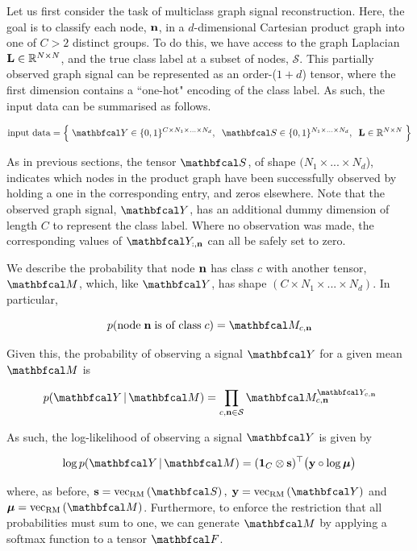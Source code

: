Let us first consider the task of multiclass graph signal reconstruction. Here, the goal is to classify each node, $\mathbf{n}$, in a $d$-dimensional Cartesian product graph into one of $C>2$ distinct groups. To do this, we have access to the graph Laplacian $\mathbf{L} \in \mathbb{R}^{N \times N}$, and the true class label at a subset of nodes, $\mathcal{S}$. This partially observed graph signal can be represented as an order-($1 + d$) tensor, where the first dimension contains a ``one-hot" encoding of the class label. As such, the input data can be summarised as follows. 

\begin{equation*}
    \text{input data} = \Big\{\; \Yt \in \{0, 1\}^{C \times N_1 \times ... \times N_d}, \;\; \St \in \{0, 1\}^{N_1 \times ... \times N_d} , \;\; \LL \in \R^{N \times N} \; \Big\}
\end{equation*}

As in previous sections, the tensor $\St$, of shape $(N_1 \times ... \times N_d$), indicates which nodes in the product graph have been successfully observed by holding a one in the corresponding entry, and zeros elsewhere. Note that the observed graph signal, $\Yt$, has an additional dummy dimension of length $C$ to represent the class label. Where no observation was made, the corresponding values of $\Yt_{:, \nn}$ can all be safely set to zero. 

We describe the probability that node $\mathbf{n}$ has class $c$ with another tensor, $\Mt$, which, like $\Yt$, has shape $(C \times N_1 \times ... \times N_d)$. In particular, 

\begin{equation*}
    p(\text{node} \; \nn \; \text{is of class} \; c) = \Mt_{c, \nn}
\end{equation*}

Given this, the probability of observing a signal $\Yt$ for a given mean $\Mt$ is

\begin{equation}
    p(\Yt \, | \, \Mt) = \prod_{c, \nn \in \mathcal{S}} \Mt_{c, \nn}^{\Yt_{c, \nn}}
\end{equation}

As such, the log-likelihood of observing a signal $\Yt$ is given by 

\begin{equation}
   \log p(\Yt \, | \, \Mt) = (\one_C \otimes \s)^\top \big(\y \circ \log \muu \big)
\end{equation}

where, as before, $\s = \vecrm{\St}, \; \y = \vecrm{\Yt}$ and $\muu = \vecrm{\Mt}$. Furthermore, to enforce the restriction that all probabilities must sum to one, we can generate $\Mt$ by applying a softmax function to a tensor $\Ft$. 

